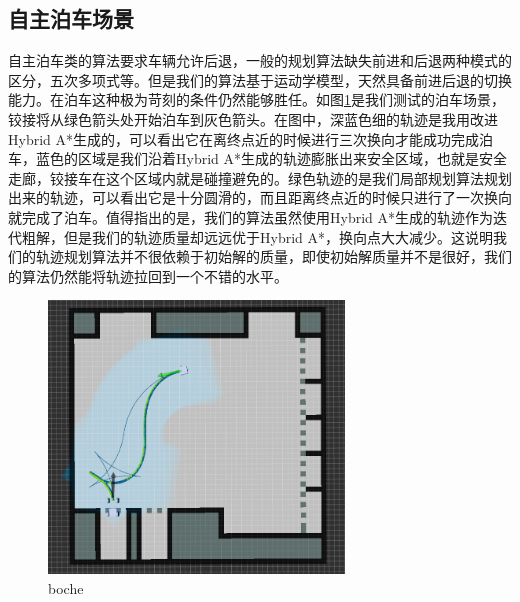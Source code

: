\documentclass[master,academic]{ysuthesis} %
\begin{document}
		\subsection{自主泊车场景}
		自主泊车类的算法要求车辆允许后退，一般的规划算法缺失前进和后退两种模式的区分，五次多项式等。但是我们的算法基于运动学模型，天然具备前进后退的切换能力。在泊车这种极为苛刻的条件仍然能够胜任。如图\ref{fig:boche}是我们测试的泊车场景，铰接将从绿色箭头处开始泊车到灰色箭头。在图中，深蓝色细的轨迹是我用改进Hybrid A*生成的，可以看出它在离终点近的时候进行三次换向才能成功完成泊车，蓝色的区域是我们沿着Hybrid A*生成的轨迹膨胀出来安全区域，也就是安全走廊，铰接车在这个区域内就是碰撞避免的。绿色轨迹的是我们局部规划算法规划出来的轨迹，可以看出它是十分圆滑的，而且距离终点近的时候只进行了一次换向就完成了泊车。值得指出的是，我们的算法虽然使用Hybrid A*生成的轨迹作为迭代粗解，但是我们的轨迹质量却远远优于Hybrid A*，换向点大大减少。这说明我们的轨迹规划算法并不很依赖于初始解的质量，即使初始解质量并不是很好，我们的算法仍然能将轨迹拉回到一个不错的水平。
		\begin{figure}[!ht]
			\centering
			\includegraphics[width=0.7\textwidth]{boche.png}
			\caption{boche}
			\label{fig:boche}
		\end{figure}
\end{document}
